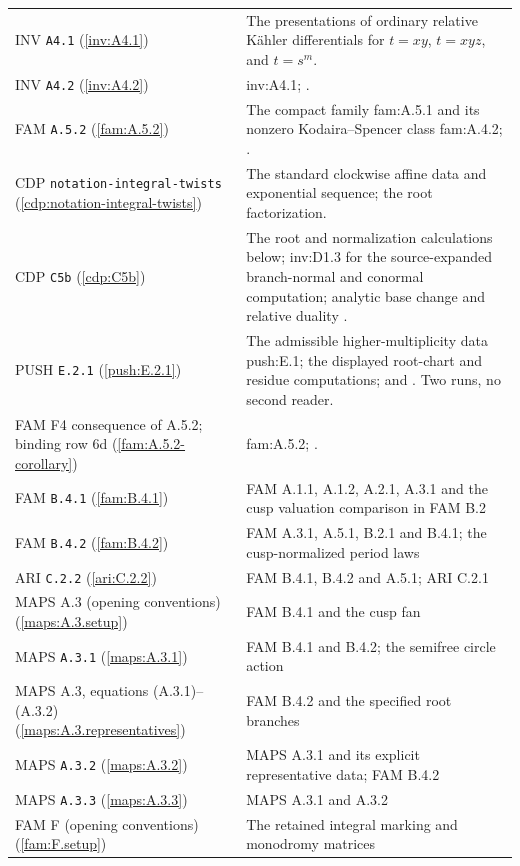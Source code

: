 \begin{longtable}{@{}L{.21\linewidth}L{.73\linewidth}@{}}
INV \nolinkurl{A4.1} (\ref{inv:A4.1}) & The presentations of ordinary relative Kähler differentials for $t=xy$, $t=xyz$, and $t=s^m$.\\
INV \nolinkurl{A4.2} (\ref{inv:A4.2}) & inv:A4.1; \cite[Remarks 1.3 and 9.21]{AC26}.\\
FAM \nolinkurl{A.5.2} (\ref{fam:A.5.2}) & The compact family fam:A.5.1 and its nonzero Kodaira--Spencer class fam:A.4.2; \cite[Theorems 1.3 and 6.12]{DGKXv1}.\\
CDP \nolinkurl{notation-integral-twists} (\ref{cdp:notation-integral-twists}) & The standard clockwise affine data and exponential sequence; the root factorization.\\
CDP \nolinkurl{C5b} (\ref{cdp:C5b}) & The root and normalization calculations below; inv:D1.3 for the source-expanded branch-normal and conormal computation; analytic base change \cite[III.4.10, III.4.12]{BS76} and relative duality \cite{RRV71}.\\
PUSH \nolinkurl{E.2.1} (\ref{push:E.2.1}) & The admissible higher-multiplicity data push:E.1; the displayed root-chart and residue computations; \cite[III.4.12]{BS76} and \cite{RRV71}. Two runs, no second reader.\\
FAM F4 consequence of A.5.2; binding row 6d (\ref{fam:A.5.2-corollary}) & fam:A.5.2; \cite[Theorem 9.1(i)]{AC26}.\\
FAM \nolinkurl{B.4.1} (\ref{fam:B.4.1}) & FAM A.1.1, A.1.2, A.2.1, A.3.1 and the cusp valuation comparison in FAM B.2\\
FAM \nolinkurl{B.4.2} (\ref{fam:B.4.2}) & FAM A.3.1, A.5.1, B.2.1 and B.4.1; the cusp-normalized period laws\\
ARI \nolinkurl{C.2.2} (\ref{ari:C.2.2}) & FAM B.4.1, B.4.2 and A.5.1; ARI C.2.1\\
MAPS A.3 (opening conventions) (\ref{maps:A.3.setup}) & FAM B.4.1 and the cusp fan\\
MAPS \nolinkurl{A.3.1} (\ref{maps:A.3.1}) & FAM B.4.1 and B.4.2; the semifree circle action\\
MAPS A.3, equations (A.3.1)--(A.3.2) (\ref{maps:A.3.representatives}) & FAM B.4.2 and the specified root branches\\
MAPS \nolinkurl{A.3.2} (\ref{maps:A.3.2}) & MAPS A.3.1 and its explicit representative data; FAM B.4.2\\
MAPS \nolinkurl{A.3.3} (\ref{maps:A.3.3}) & MAPS A.3.1 and A.3.2\\
FAM F (opening conventions) (\ref{fam:F.setup}) & The retained integral marking and monodromy matrices\\

\end{longtable}
